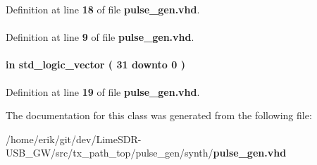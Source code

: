 Definition at line {\bf 18} of file {\bf pulse\+\_\+gen.\+vhd}.

\paragraph[{std\+\_\+logic\+\_\+1164}]{\hspace{0.3cm}{\ttfamily [Package]}}\label{classpulse__gen_acd03516902501cd1c7296a98e22c6fcb}


Definition at line {\bf 9} of file {\bf pulse\+\_\+gen.\+vhd}.

\paragraph[{wait\+\_\+cycles}]{ {\bfseries \textcolor{keywordflow}{in}\textcolor{vhdlchar}{ }} {\bfseries \textcolor{comment}{std\+\_\+logic\+\_\+vector}\textcolor{vhdlchar}{ }\textcolor{vhdlchar}{(}\textcolor{vhdlchar}{ }\textcolor{vhdlchar}{ } \textcolor{vhdldigit}{31} \textcolor{vhdlchar}{ }\textcolor{keywordflow}{downto}\textcolor{vhdlchar}{ }\textcolor{vhdlchar}{ } \textcolor{vhdldigit}{0} \textcolor{vhdlchar}{ }\textcolor{vhdlchar}{)}\textcolor{vhdlchar}{ }} \hspace{0.3cm}{\ttfamily [Port]}}\label{classpulse__gen_acf236344a5eaf7a90c7d3c542101119f}


Definition at line {\bf 19} of file {\bf pulse\+\_\+gen.\+vhd}.



The documentation for this class was generated from the following file\+:\begin{DoxyCompactItemize}
\item 
/home/erik/git/dev/\+Lime\+S\+D\+R-\/\+U\+S\+B\+\_\+\+G\+W/src/tx\+\_\+path\+\_\+top/pulse\+\_\+gen/synth/{\bf pulse\+\_\+gen.\+vhd}\end{DoxyCompactItemize}
